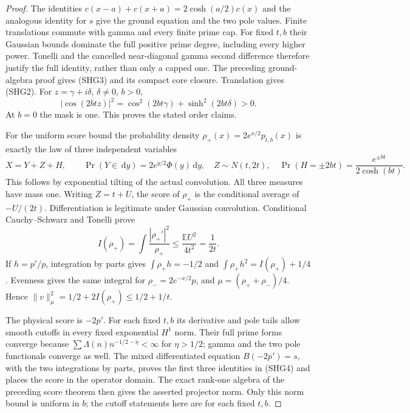 \documentclass[11pt]{article}
\theoremstyle{remark}\newtheorem{remark}[theorem]{Remark}
\newcommand{\dd}{\,\mathrm d}
\begin{document}
\begin{proof}
The identities
$c(x-a)+c(x+a)=2\cosh(a/2)c(x)$ and the analogous identity
for $s$ give the ground equation and the two pole values.
Finite translations commute with gamma and every finite prime
cap. For fixed $t,b$ their Gaussian bounds dominate the full
positive prime degree, including every higher power. Tonelli
and the cancelled near-diagonal gamma second difference
therefore justify the full identity, rather than only a capped
one. The preceding ground-algebra proof gives (SHG3) and
its compact core closure. Translation gives (SHG2).
For $z=\gamma+i\delta$, $\delta\ne0$, $b>0$,
\[
 |\cos(2btz)|^2=\cos^2(2bt\gamma)+\sinh^2(2bt\delta)>0.
\]
At $b=0$ the mask is one. This proves the stated order claims.

For the uniform score bound the probability density
$\rho_+(x)=2e^{x/2}p_{t,b}(x)$ is exactly the law of
three independent variables
\[
 X=Y+Z+H,\qquad
 \Pr(Y\in\dd y)=2e^{y/2}\Phi(y)\dd y,\quad
 Z\sim N(t,2t),\quad
 \Pr(H=\pm2bt)=\frac{e^{\pm bt}}{2\cosh(bt)}.       \tag{SHG5}
\]
This follows by exponential tilting of the actual convolution.
All three measures have mass one. Writing $Z=t+U$, the score
of $\rho_+$ is the conditional average of $-U/(2t)$.
Differentiation is legitimate under Gaussian convolution.
Conditional Cauchy--Schwarz and Tonelli prove
\[
 I(\rho_+)=\int\frac{|\rho_+'|^2}{\rho_+}
            \le \frac{\mathbb E U^2}{4t^2}=\frac1{2t}.
\]
If $h=p'/p$, integration by parts gives
$\int\rho_+h=-1/2$ and
$\int\rho_+h^2=I(\rho_+)+1/4$.
Evenness gives the same integral for
$\rho_-=2e^{-x/2}p$, and
$\mu=(\rho_++\rho_-)/4$. Hence
$\|v\|_\mu^2=1/2+2I(\rho_+)\le1/2+1/t$.

The physical score is $-2p'$.
For each fixed $t,b$ its derivative and pole tails allow
smooth cutoffs in every fixed exponential $H^1$ norm.
Their full prime forms converge because
$\sum\Lambda(n)n^{-1/2-\eta}<\infty$ for $\eta>1/2$;
gamma and the two pole functionals converge as well.
The mixed differentiated equation $B(-2p')=s$, with the
two integrations by parts, proves the first three identities
in (SHG4) and places the score in the operator domain.
The exact rank-one algebra of the preceding score theorem
then gives the asserted projector norm.
Only this norm bound is uniform in $b$; the cutoff statements
here are for each fixed $t,b$.
\end{proof}
\end{document}
